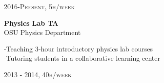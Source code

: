 \documentclass[10pt]{article} %
\begin{document}
{\begin{minipage}[t]{0.5\textwidth}

{\raggedleft\textsc{2016-Present, 5h/week}\par}
{\raggedright\large \textbf{Physics Lab TA}\\
{OSU Physics Department}\\[5pt]}
\hspace*{0.2in}-Teaching 3-hour introductory physics lab courses\\
\hspace*{0.2in}-Tutoring students in a collaborative learning center\\




{\raggedleft\textsc{2013 - 2014, 40h/week}\par}


\end{minipage}}
\end{document}
